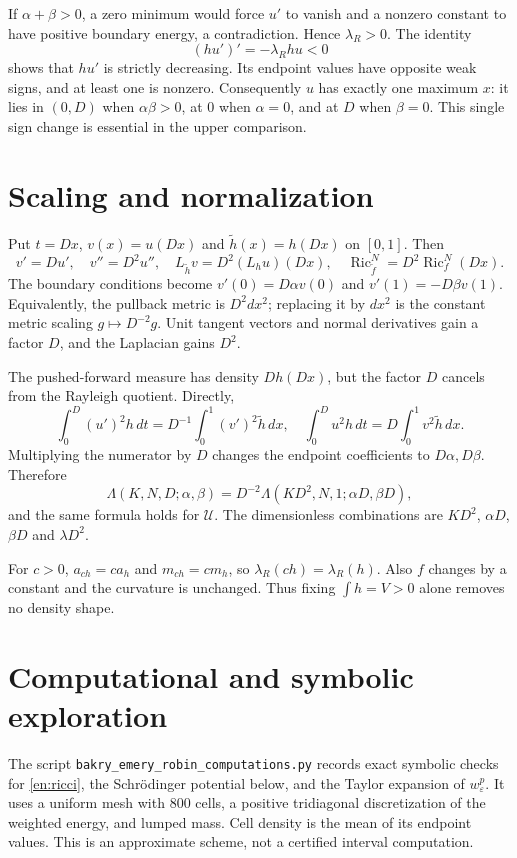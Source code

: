 \documentclass[12pt]{amsart}
\theoremstyle{definition}
\theoremstyle{remark}
\numberwithin{equation}{section}
\DeclareMathOperator{\Ric}{Ric}
\begin{document}
If $\alpha+\beta>0$, a zero minimum would force $u'$ to vanish and a nonzero constant to have positive boundary energy, a contradiction. Hence $\lambda_R>0$. The identity
\begin{equation}\label{en:flux}
 (hu')'=-\lambda_R hu<0
\end{equation}
shows that $hu'$ is strictly decreasing. Its endpoint values have opposite weak signs, and at least one is nonzero. Consequently $u$ has exactly one maximum $x$: it lies in $(0,D)$ when $\alpha\beta>0$, at $0$ when $\alpha=0$, and at $D$ when $\beta=0$. This single sign change is essential in the upper comparison.

\section{Scaling and normalization}
Put $t=Dx$, $v(x)=u(Dx)$ and $\widetilde h(x)=h(Dx)$ on $[0,1]$. Then
\[
 v'=Du',\quad v''=D^2u'',\quad
 L_{\widetilde h}v=D^2(L_hu)(Dx),\quad
 \Ric_{\widetilde f}^N=D^2\Ric_f^N(Dx).
\]
The boundary conditions become $v'(0)=D\alpha v(0)$ and $v'(1)=-D\beta v(1)$. Equivalently, the pullback metric is $D^2dx^2$; replacing it by $dx^2$ is the constant metric scaling $g\mapsto D^{-2}g$. Unit tangent vectors and normal derivatives gain a factor $D$, and the Laplacian gains $D^2$.

The pushed-forward measure has density $Dh(Dx)$, but the factor $D$ cancels from the Rayleigh quotient. Directly,
\[
 \int_0^D(u')^2h\,dt=D^{-1}\int_0^1(v')^2\widetilde h\,dx,
 \quad \int_0^D u^2h\,dt=D\int_0^1v^2\widetilde h\,dx.
\]
Multiplying the numerator by $D$ changes the endpoint coefficients to $D\alpha,D\beta$. Therefore
\begin{equation}\label{en:scaling}
 \Lambda(K,N,D;\alpha,\beta)=D^{-2}\Lambda(KD^2,N,1;\alpha D,\beta D),
\end{equation}
and the same formula holds for $\mathcal U$. The dimensionless combinations are $KD^2$, $\alpha D$, $\beta D$ and $\lambda D^2$.

For $c>0$, $a_{ch}=ca_h$ and $m_{ch}=cm_h$, so $\lambda_R(ch)=\lambda_R(h)$. Also $f$ changes by a constant and the curvature is unchanged. Thus fixing $\int h=V>0$ alone removes no density shape.

\section{Computational and symbolic exploration}
The script \texttt{bakry\_emery\_robin\_\allowbreak computations.py} records exact symbolic checks for \eqref{en:ricci}, the Schr\"odinger potential below, and the Taylor expansion of $w_\varepsilon^p$. It uses a uniform mesh with 800 cells, a positive tridiagonal discretization of the weighted energy, and lumped mass. Cell density is the mean of its endpoint values. This is an approximate scheme, not a certified interval computation.
\end{document}
